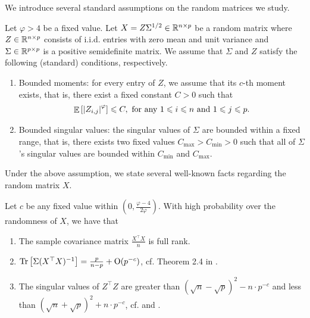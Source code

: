 We introduce several standard assumptions on the random matrices we study.
\begin{assumption}\label{assume_rm}
	Let $\varphi > 4$ be a fixed value.
	Let $X = Z \Sigma^{1/2} \in\mathbb{R}^{n\times p}$ be a random matrix where $Z \in \mathbb{R}^{n\times p}$ consists of i.i.d. entries with zero mean and unit variance and $\Sigma \in \mathbb{R}^{p\times p}$ is a positive semidefinite matrix.
	We assume that $\Sigma$ and $Z$ satisfy the following (standard) conditions, respectively.
	\begin{enumerate}
		\item Bounded moments: for every entry of $Z$, we assume that its $c$-th moment exists, that is, there exist a fixed constant $C > 0$ such that
			\begin{align}\label{assmAhigh}
				\mathop{\mathbb{E}}\left[ \left\lvert Z_{i,j}\right\rvert^{\varphi} \right] \leqslant C, \text{ for any } 1\leqslant i \leqslant n \text{ and } 1\leqslant j \leqslant p.
			\end{align}
		\item Bounded singular values: the singular values of $\Sigma$ are bounded within a fixed range, that is, there exists two fixed values $C_{\max} > C_{\min} > 0$ such that all of $\Sigma$'s singular values are bounded within $C_{\min}$ and $C_{\max}$.
	\end{enumerate}
\end{assumption}

Under the above assumption, we state several well-known facts regarding the random matrix $X$.

\begin{fact}\label{lem_minv}
	Let $c$ be any fixed value within $(0, \frac{\varphi - 4}{2\varphi})$.
	With high probability over the randomness of $X$, we have that
	\begin{enumerate}
		\item The sample covariance matrix $\frac{X^{\top}X}{n}$ is full rank.
		\item $\operatorname{Tr}\left[\Sigma (X^{\top} X)^{-1}\right] = \frac{p}{n - p} + \operatorname{O}(p^{-c})$, cf. Theorem 2.4 in \citet{isotropic}.
		\item The singular values of $Z^{\top}Z$ are greater than $(\sqrt{n} - \sqrt{p})^2 - n \cdot p^{-c}$ and less than $(\sqrt{n} + \sqrt{p})^2 + n \cdot p^{-c}$, cf. \citet[Theorem 2.10]{isotropic} and \citet[Lemma 3.12]{DY}.
	\end{enumerate}
\end{fact}

